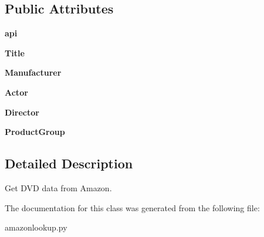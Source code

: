 \subsection*{Public Attributes}
\begin{DoxyCompactItemize}
\item 
\hypertarget{classsrc_1_1amazonlookup_1_1DVDlookup_a185d9c2a40c3cda7cb995026b329ba44}{
{\bfseries api}}
\label{classsrc_1_1amazonlookup_1_1DVDlookup_a185d9c2a40c3cda7cb995026b329ba44}

\item 
\hypertarget{classsrc_1_1amazonlookup_1_1DVDlookup_a66da5478af1d15271bf1206ec31ccb25}{
{\bfseries Title}}
\label{classsrc_1_1amazonlookup_1_1DVDlookup_a66da5478af1d15271bf1206ec31ccb25}

\item 
\hypertarget{classsrc_1_1amazonlookup_1_1DVDlookup_a3c3349cdbd2e98dc8a690de1fe619a2c}{
{\bfseries Manufacturer}}
\label{classsrc_1_1amazonlookup_1_1DVDlookup_a3c3349cdbd2e98dc8a690de1fe619a2c}

\item 
\hypertarget{classsrc_1_1amazonlookup_1_1DVDlookup_a5dd2c5b02f4d3ccfdf863e1966d7458e}{
{\bfseries Actor}}
\label{classsrc_1_1amazonlookup_1_1DVDlookup_a5dd2c5b02f4d3ccfdf863e1966d7458e}

\item 
\hypertarget{classsrc_1_1amazonlookup_1_1DVDlookup_a0c286c5247e87dfdbcb1b1be024dc93a}{
{\bfseries Director}}
\label{classsrc_1_1amazonlookup_1_1DVDlookup_a0c286c5247e87dfdbcb1b1be024dc93a}

\item 
\hypertarget{classsrc_1_1amazonlookup_1_1DVDlookup_a3d6a8682d444f59c818f5a748db1c71c}{
{\bfseries ProductGroup}}
\label{classsrc_1_1amazonlookup_1_1DVDlookup_a3d6a8682d444f59c818f5a748db1c71c}

\end{DoxyCompactItemize}


\subsection{Detailed Description}
\begin{DoxyVerb}
Get DVD data from Amazon.
\end{DoxyVerb}
 

The documentation for this class was generated from the following file:\begin{DoxyCompactItemize}
\item 
amazonlookup.py\end{DoxyCompactItemize}
